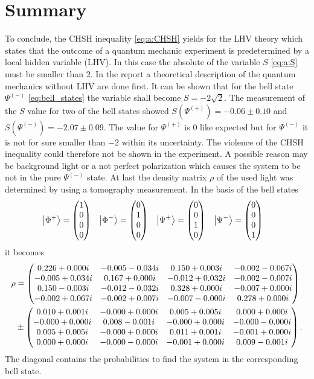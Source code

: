 \section{Summary}
To conclude, the CHSH inequality \eqref{eq:a:CHSH} yields for the LHV theory which states that the outcome of a quantum mechanic experiment is predetermined by a local hidden variable (LHV).
In this case the absolute of the variable $S$ \eqref{eq:a:S} must be smaller than 2.
In the report a theoretical description of the quantum mechanics without LHV are done first.
It can be shown that for the bell state $\Psi^{(-)}$ \eqref{eq:bell_states} the variable shall become $S=-2\sqrt{2}$.
The measurement of the $S$ value for two of the bell states showed $S(\Psi^{(+)})=-0.06\pm0.10$ and $S(\Psi^{(-)})=-2.07\pm0.09$.
The value for $\Psi^{(+)}$ is 0 like expected but for $\Psi^{(-)}$ it is not for sure smaller than $-2$ within its uncertainty.
The violence of the CHSH inequality could therefore not be shown in the experiment.
A possible reason may be background light or a not perfect polarization which causes the system to be not in the pure $\Psi^{(-)}$ state.
At last the density matrix $\rho$ of the used light was determined by using a tomography measurement.
In the basis of the bell states
\begin{align*}
\ket{\Phi^{+}}
    &=\begin{pmatrix}1\\0\\0\\0\end{pmatrix}
    &\ket{\Phi^{-}}
    &=\begin{pmatrix}0\\1\\0\\0\end{pmatrix}
    &\ket{\Psi^{+}}
    &=\begin{pmatrix}0\\0\\1\\0\end{pmatrix}
    &\ket{\Psi^{-}}
    &=\begin{pmatrix}0\\0\\0\\1\end{pmatrix}
\end{align*}
it becomes
\begin{align*}
\rho
    &=\begin{pmatrix} 0.226+0.000i &-0.005-0.034i &0.150+0.003i &-0.002-0.067i\\ -0.005+0.034i &0.167+0.000i &-0.012+0.032i &-0.002-0.007i\\ 0.150-0.003i &-0.012-0.032i &0.328+0.000i &-0.007+0.000i\\ -0.002+0.067i &-0.002+0.007i &-0.007-0.000i &0.278+0.000i \end{pmatrix}
    \\
    &\pm \begin{pmatrix} 0.010+0.001i &-0.000+0.000i &0.005+0.005i &0.000+0.000i\\ -0.000+0.000i &0.008-0.001i &-0.000+0.000i &-0.000-0.000i\\ 0.005+0.005i &-0.000+0.000i &0.011+0.001i &-0.001+0.000i\\ 0.000+0.000i &-0.000-0.000i &-0.001+0.000i &0.009-0.001i \end{pmatrix} .
\end{align*}
The diagonal contains the probabilities to find the system in the corresponding bell state.